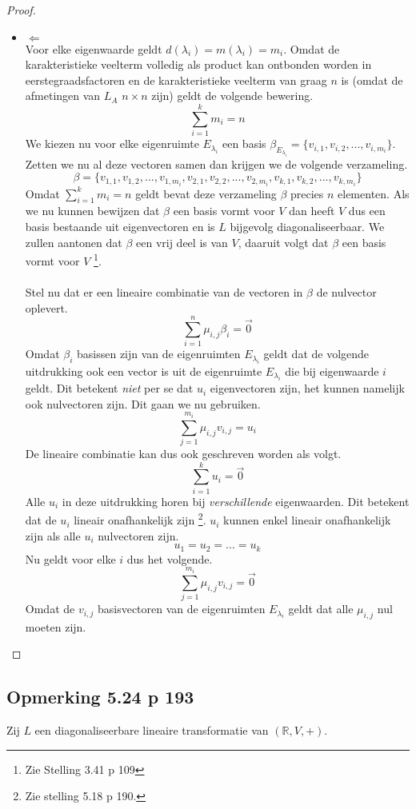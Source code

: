 \documentclass[lineaire_algebra_oplossingen.tex]{subfiles}
\begin{document}
\begin{proof}
\begin{itemize}
\item $\Leftarrow$\\
Voor elke eigenwaarde geldt $d(\lambda_i) = m(\lambda_i) = m_i$.
Omdat de karakteristieke veelterm volledig als product kan ontbonden worden in eerstegraadsfactoren en de karakteristieke veelterm van graag $n$ is (omdat de afmetingen van $L_A$ $n\times
n$ zijn) geldt de volgende bewering.
\[
\sum_{i=1}^km_i = n
\]
We kiezen nu voor elke eigenruimte $E_{\lambda_i}$ een basis $\beta_{E_{\lambda_i}} = \{v_{i,1},v_{i,2},...,v_{i,m_i}\}$. Zetten we nu al deze vectoren samen dan krijgen we de volgende verzameling.
\[
\beta = 
\{
v_{1,1},v_{1,2},...,v_{1,m_i},v_{2,1},v_{2,2},...,v_{2,m_i},v_{k,1},v_{k,2},...,v_{k,m_i}
\}
\]
Omdat $\sum_{i=1}^km_i = n$ geldt bevat deze verzameling $\beta$ precies $n$ elementen.
Als we nu kunnen bewijzen dat $\beta$ een basis vormt voor $V$ dan heeft $V$ dus een basis bestaande uit eigenvectoren en is $L$ bijgevolg diagonaliseerbaar. We zullen aantonen dat $\beta$ een vrij deel is van $V$, daaruit volgt dat $\beta$ een basis vormt voor $V$ \footnote{Zie Stelling 3.41 p 109}.\\\\
Stel nu dat er een lineaire combinatie van de vectoren in $\beta$ de nulvector oplevert.
\[
\sum_{i=1}^n\mu_{i,j}\beta_i = \vec{0}
\]
Omdat $\beta_i$ basissen zijn van de eigenruimten $E_{\lambda_i}$ geldt dat de volgende uitdrukking ook een vector is uit de eigenruimte $E_{\lambda_i}$ die bij eigenwaarde $i$ geldt. Dit betekent \emph{niet} per se dat $u_i$ eigenvectoren zijn, het kunnen namelijk ook nulvectoren zijn. Dit gaan we nu gebruiken.
\[
\sum_{j=1}^{m_i} \mu_{i,j}v_{i,j} = u_i
\]
De lineaire combinatie kan dus ook geschreven worden als volgt.
\[
\sum_{i=1}^ku_i = \vec{0}
\]
Alle $u_i$ in deze uitdrukking horen bij \emph{verschillende} eigenwaarden. Dit betekent dat de $u_i$ lineair onafhankelijk zijn \footnote{Zie stelling 5.18 p 190.}. $u_i$ kunnen enkel lineair onafhankelijk zijn als alle $u_i$ nulvectoren zijn.
\[
u_1 = u_2 = ... = u_k
\]
Nu geldt voor elke $i$ dus het volgende.
\[
\sum_{j=1}^{m_i} \mu_{i,j}v_{i,j} = \vec{0}
\]
Omdat de $v_{i,j}$ basisvectoren van de eigenruimten $E_{\lambda_i}$ geldt dat alle $\mu_{i,j}$ nul moeten zijn.
\end{itemize}
\end{proof}

\subsection{Opmerking 5.24 p 193}
Zij $L$ een diagonaliseerbare lineaire transformatie van $(\mathbb{R},V,+)$. 
\end{document}
